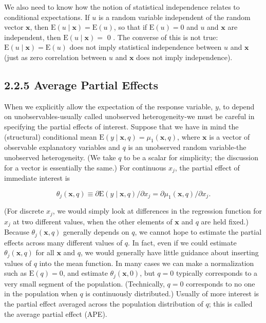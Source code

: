 \documentclass[10pt]{article}
\begin{document}
We also need to know how the notion of statistical independence relates to conditional expectations. If $u$ is a random variable independent of the random vector $\mathbf{x}$, then $\mathrm{E}(u \mid \mathbf{x})=\mathrm{E}(u)$, so that if $\mathrm{E}(u)=0$ and $u$ and $\mathbf{x}$ are independent, then $\mathrm{E}(u \mid \mathbf{x})=$ 0 . The converse of this is not true: $\mathrm{E}(u \mid \mathbf{x})=\mathrm{E}(u)$ does not imply statistical independence between $u$ and $\mathbf{x}$ (just as zero correlation between $u$ and $\mathbf{x}$ does not imply independence).

\subsection*{2.2.5 Average Partial Effects}
When we explicitly allow the expectation of the response variable, $y$, to depend on unobservables-usually called unobserved heterogeneity-we must be careful in specifying the partial effects of interest. Suppose that we have in mind the (structural) conditional mean $\mathrm{E}(y \mid \mathbf{x}, q)=\mu_{1}(\mathbf{x}, q)$, where $\mathbf{x}$ is a vector of observable explanatory variables and $q$ is an unobserved random variable-the unobserved heterogeneity. (We take $q$ to be a scalar for simplicity; the discussion for a vector is essentially the same.) For continuous $x_{j}$, the partial effect of immediate interest is


\begin{equation*}
\theta_{j}(\mathbf{x}, q) \equiv \partial \mathrm{E}(y \mid \mathbf{x}, q) / \partial x_{j}=\partial \mu_{1}(\mathbf{x}, q) / \partial x_{j} . \tag{2.30}
\end{equation*}


(For discrete $x_{j}$, we would simply look at differences in the regression function for $x_{j}$ at two different values, when the other elements of $\mathbf{x}$ and $q$ are held fixed.) Because $\theta_{j}(\mathbf{x}, q)$ generally depends on $q$, we cannot hope to estimate the partial effects across many different values of $q$. In fact, even if we could estimate $\theta_{j}(\mathbf{x}, q)$ for all $\mathbf{x}$ and $q$, we would generally have little guidance about inserting values of $q$ into the mean function. In many cases we can make a normalization such as $\mathrm{E}(q)=0$, and estimate $\theta_{j}(\mathbf{x}, 0)$, but $q=0$ typically corresponds to a very small segment of the population. (Technically, $q=0$ corresponds to no one in the population when $q$ is continuously distributed.) Usually of more interest is the partial effect averaged across the population distribution of $q$; this is called the average partial effect (APE).
\end{document}
